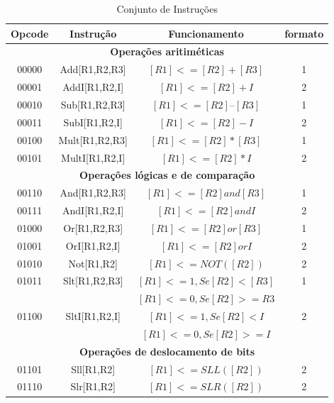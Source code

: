 \begin{table}[!htb]
\centering
\caption{Conjunto de Instruções}


\begin{tabular}{|c|c|c|c|}
 
\hline
\textbf{Opcode} & \textbf{Instrução} & \textbf{Funcionamento} & \textbf{formato}\\
\hline 

\multicolumn{4}{|c|}{\textbf{Operações aritiméticas}}\\

\hline 
00000 & Add[R1,R2,R3]  & $[R1]<= [R2] + [R3]$ & 1\\
\hline 
00001 & AddI[R1,R2,I]  & $[R1]<= [R2] + I$    & 2\\
\hline 
00010 & Sub[R1,R2,R3]  & $[R1]<= [R2]–[R3]$   & 1\\
\hline 
00011 & SubI[R1,R2,I]  & $[R1]<= [R2] - I$    & 2\\
\hline 
00100 & Mult[R1,R2,R3] & $[R1]<= [R2] * [R3]$ & 1\\
\hline 
00101 & MultI[R1,R2,I] & $[R1]<= [R2] * I$    & 2\\

\hline
\multicolumn{4}{|c|}{\textbf{Operações lógicas e de comparação}}\\
\hline

00110 & And[R1,R2,R3]  & $[R1]<= [R2] and [R3]$   & 1\\
\hline 
00111 & AndI[R1,R2,I]  & $[R1]<= [R2] and I$      & 2\\
\hline 
01000 & Or[R1,R2,R3]   & $[R1]<= [R2] or [R3]$    & 1\\
\hline 
01001 & OrI[R1,R2,I]   & $[R1]<= [R2] or I$       & 2\\
\hline 
01010 & Not[R1,R2]     & $[R1]<= NOT([R2])$       & 2\\
\hline 
01011 & Slt[R1,R2,R3]  & $[R1]<= 1, Se [R2]<[R3]$ & 1\\ && $[R1]<= 0, Se [R2]>= R3$ &\\
\hline 
01100 & SltI[R1,R2,I]  & $[R1]<= 1, Se [R2]< I $ & 2\\ && $ [R1] <= 0, Se [R2]>= I$   &\\

\hline
\multicolumn{4}{|c|}{\textbf{Operações de deslocamento de bits}}\\
\hline

01101 & Sll[R1,R2] & $[R1]<= SLL([R2])$  & 2\\
\hline 
01110 & Slr[R1,R2] & $[R1]<= SLR([R2])$  & 2\\


\end{tabular}
\end{table}
